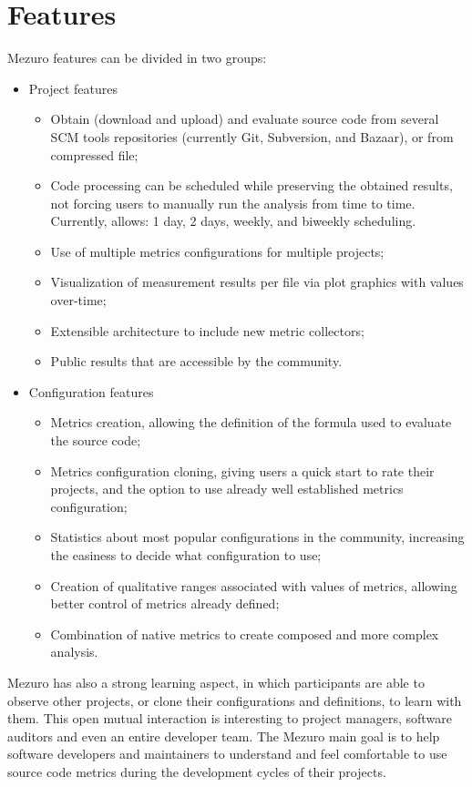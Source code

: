 \section{Features}
\label{sec:features}

Mezuro features can be divided in two groups:

\begin{itemize}
    \item Project features
    \begin{itemize}
        \item Obtain (download and upload) and evaluate source code from
            several SCM tools repositories (currently Git, Subversion, and
            Bazaar), or from compressed file;
        \item Code processing can be scheduled while preserving the obtained
            results, not forcing users to manually run the analysis from time
            to time. Currently, allows: 1 day, 2 days, weekly, and biweekly
            scheduling.
        \item Use of multiple metrics configurations for multiple projects;
        \item Visualization of measurement results per file via plot graphics
            with values over-time;
        \item Extensible architecture to include new metric collectors;
        \item Public results that are accessible by the community.
    \end{itemize}

    \item Configuration features
    \begin{itemize}
        \item Metrics creation, allowing the definition of the formula
            used to evaluate the source code;
        \item Metrics configuration cloning, giving users a quick start to rate
            their projects, and the option to use already well established
            metrics configuration;
        \item Statistics about most popular configurations in the community,
            increasing the easiness to decide what configuration to use;
        \item Creation of qualitative ranges associated with values of metrics,
            allowing better control of metrics already defined;
        \item Combination of native metrics to create composed and more complex
            analysis.
    \end{itemize}
\end{itemize}

Mezuro has also a strong learning aspect, in which participants are able to
observe other projects, or clone their configurations and definitions, to learn
with them.  This open mutual interaction is interesting to project managers,
software auditors and even an entire developer team. The Mezuro main goal is to
help software developers and maintainers to understand and feel comfortable to
use source code metrics during the development cycles of their projects.

